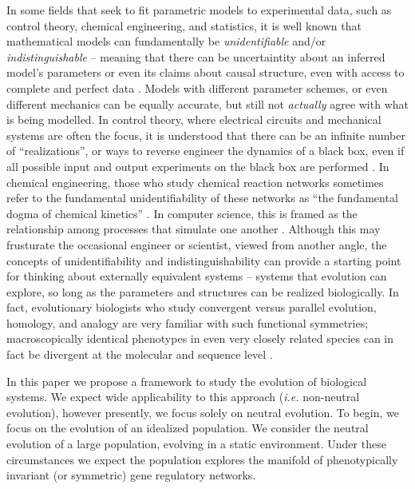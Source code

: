 \documentclass[9 pt]{article}
\newcommand{\1}{\mathbbm{1}}
\begin{document}
In some fields that seek to fit parametric models to experimental data, such as control
theory, chemical engineering, and statistics, it is well known that mathematical models
can fundamentally be \emph{unidentifiable} and/or \emph{indistinguishable} -- meaning that 
there can be uncertaintity about an inferred model's parameters or even its claims about
causal structure, even with access to complete and perfect data \citep{bellman1970structural, grewal1976identifiability, walter1984structural}. Models with different 
parameter schemes, or even different mechanics can be equally accurate, but still not
\emph{actually} agree with what is being modelled. In control theory, where electrical 
circuits and mechanical systems are often the focus, it is understood that there can be an 
infinite number of ``realizations'', or ways to reverse engineer the dynamics of a black box,
even if all possible input and output experiments on the black box are performed \citep{kalman1963mathematical, anderson1966equivalence, zadeh1976linear}. In chemical
engineering, those who study chemical reaction networks sometimes refer to the fundamental
unidentifiability of these networks as ``the fundamental dogma of chemical kinetics'' \citep{craciun2008identifiability}. In computer science, this is framed as the relationship among processes that simulate one another \citep{van2004equivalence}.
Although this may frusturate the occasional engineer or scientist, viewed from another angle,
the concepts of unidentifiability and indistinguishability can provide a starting point for
thinking about externally equivalent systems -- systems that evolution can explore, so long
as the parameters and structures can be realized biologically. In fact, evolutionary
biologists who study convergent versus parallel evolution, homology, and analogy are very familiar with such functional symmetries; macroscopically identical phenotypes in even very closely related species can in fact be divergent at the molecular and sequence level \citep{true2001developmental, tsong2006evolution, hare2008sepsid, vierstra2014mouse, stergachis2014conservation, taylor2016diverse, matsui2015regulatory}.

  In this paper we propose a framework to study the evolution of biological systems. We expect wide applicability to this approach (\emph{i.e.} non-neutral evolution), however presently, we focus solely on neutral evolution. To begin, we focus on the evolution of an idealized population. We consider the neutral evolution of a large population, evolving in a static environment. Under these circumstances we expect the population explores the manifold of phenotypically invariant (or symmetric) gene regulatory networks.
\end{document}
